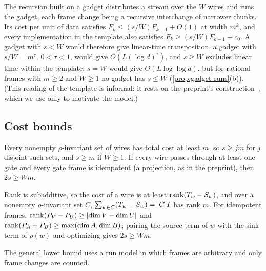 The recursion built on a gadget distributes a stream over the $W$ wires and runs the gadget, each frame
change being a recursive interchange of narrower chunks. Its cost per unit of data satisfies
$F_k\le(s/W)F_{k-1}+O(1)$ at width $m^k$, and every implementation in the template also satisfies
$F_k\ge(s/W)F_{k-1}+c_0$. A gadget with $s<W$ would therefore give linear-time transposition, a gadget
with $s/W=m^\tau$, $0<\tau<1$, would give $O(L(\log d)^\tau)$, and $s\ge W$ excludes linear time within the
template; $s=W$ would give $\Theta(L\log\log d)$, but for rational frames with $m\ge2$ and $W\ge1$ no gadget has $s\le W$ (\cref{prop:gadget-runs}(b)). (This reading of the template is informal: it rests on the
preprint's construction~\cite{OpenAI2026mult}, which we use only to motivate the model.)

\subsection{Cost bounds}

\begin{theorem}\label{thm:cycle}
Every nonempty $\rho$-invariant set of wires has total cost at least $m$, so $s\ge jm$ for $j$ disjoint
such sets, and $s\ge m$ if $W\ge1$. If every wire passes through at least one gate and every gate frame is
idempotent (a projection, as in the preprint), then $2s\ge Wm$.
\end{theorem}

\begin{outline}
Rank is subadditive, so the cost of a wire is at least $\operatorname{rank}(T_w-S_w)$, and over a nonempty $\rho$-invariant set $C$,
$\sum_{w\in C}(T_w-S_w)=\lvert C \rvert I$ has rank $m$. For idempotent frames, $\operatorname{rank}(P_V-P_U)\ge\lvert \dim V-\dim
U \rvert$ and $\operatorname{rank}(P_A+P_B)\ge\max(\dim A,\dim B)$; pairing the source term of $w$ with the sink term of
$\rho(w)$ and optimizing gives $2s\ge Wm$.
\end{outline}

The general lower bound uses a run model in which frames are arbitrary and only frame changes are counted.

